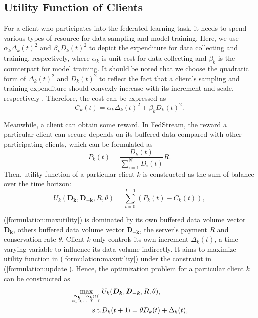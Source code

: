 \documentclass{article}
\theoremstyle{plain}
\theoremstyle{definition}
\theoremstyle{remark}
\begin{document}
\subsection{Utility Function of Clients}
\label{section:utility function}
For a client who participates into the federated learning task, it needs to spend various types of resource for data sampling and model training.
Here, we use $\alpha_k \Delta_k(t)^2$ and $\beta_k D_k(t)^2$ to depict the expenditure for data collecting and training, respectively, where $\alpha_k$ is unit cost for data collecting and $\beta_k$ is the counterpart for model training.
It should be noted that we choose the quadratic form of $\Delta_k(t)^2$ and $D_k(t)^2$ to reflect the fact that a client's sampling and training expenditure should convexly increase with its increment and scale, respectively \cite{wang2019dynamic}.
Therefore, the cost can be expressed as
\begin{equation}
  C_k(t) = \alpha_k \Delta_k(t)^2 + \beta_k D_k(t)^2.
\end{equation}

Meanwhile, a client can obtain some reward.
In FedStream, the reward a particular client can secure depends on its buffered data compared with other participating clients, which can be formulated as
\begin{equation}
  P_k(t) = \frac{D_k(t)}{\sum_{i=1}^{N}D_i(t)}R.
\end{equation}
Then, utility function of a particular client $k$ is constructed as the sum of balance over the time horizon:
\begin{equation}
  \label{formulation:maxutility}
  U_k(\boldsymbol{D_k}, \boldsymbol{D_{-k}}, R, \theta) = \sum_{t=0}^{T-1} \left(P_k(t) - C_k(t)\right),
\end{equation}

(\ref{formulation:maxutility}) is dominated by its own buffered data volume vector $\boldsymbol{D_k}$, others buffered data volume vector $\boldsymbol{D_{-k}}$, the server's payment $R$ and conservation rate $\theta$.
Client $k$ only controls its own increment $\Delta_k(t)$, a time-varying variable to influence its data volume indirectly.
It aims to maximize utility function in (\ref{formulation:maxutility}) under the constraint in (\ref{formulation:update}).
Hence, the optimization problem for a particular client $k$ can be constructed as
\begin{equation}
  \begin{aligned}
    \max_{\boldsymbol{\Delta_k}=[\Delta_k(t)] \atop t \in [0,\cdots,T-1]} & U_k(\boldsymbol{D_k}, \boldsymbol{D_{-k}}, R, \theta), \\
    \text{s.t.} & D_k(t + 1) = \theta D_k(t) + \Delta_k(t),
  \end{aligned}  
\end{equation}
\end{document}
